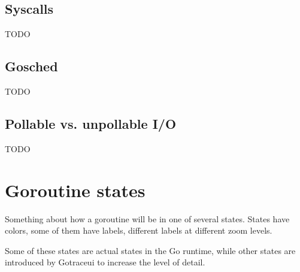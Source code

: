 \documentclass[10pt,letterpaper,oneside,openany,showtrims,draft]{memoir}
\newcommand{\todo}[1]{{\color{red}#1}}
\begin{document}
\subsection{Syscalls}\label{syscalls}
\todo{TODO}

\subsection{Gosched}
\todo{TODO}

\subsection{Pollable vs. unpollable I/O}\label{netpoller}
\todo{TODO}

\section{Goroutine states}\label{goroutine-states}
\todo{
  Something about how a goroutine will be in one of several states.
  States have colors, some of them have labels, different labels at different zoom levels.
}

Some of these states are actual states in the Go runtime, while other states are introduced by Gotraceui to increase
the level of detail.
\end{document}
